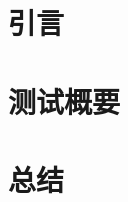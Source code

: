 \documentclass[12pt,hyperref,a4paper,UTF8]{ctexart}
\begin{document}
\cover

%
%

\thispagestyle{empty} %

\newpage
\tableofcontents

\newpage


\section{引言}

\section{测试概要}




\section{总结}

\newpage


\end{document}
